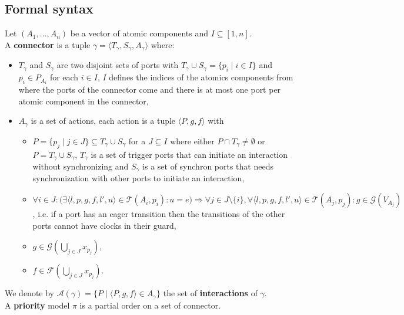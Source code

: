 \documentclass[a4paper]{article}
\begin{document}
\subsection*{Formal syntax}
Let $(A_1, \ldots, A_n)$ be a vector of atomic components and $I \subseteq [1,n]$. \\
A \textbf{connector} is a tuple $\gamma = \langle T_{\gamma}, S_{\gamma}, A_{\gamma} \rangle$ where:
\begin{itemize}
  \item $T_{\gamma}$ and $S_{\gamma}$ are two disjoint sets of ports with
        $T_{\gamma} \cup S_{\gamma} = \{p_i \mid i \in I\}$ and $p_i \in P_{A_i}$ for each $i \in I$, $I$ defines the
        indices of the atomics components from where the ports of the connector come and there is at most one port per
        atomic component in the connector,
  \item $A_{\gamma}$ is a set of actions, each action is a tuple $\langle P, g, f \rangle$ with
        \begin{itemize}
          \item $P = \{p_j \mid j \in J\} \subseteq T_{\gamma} \cup S_{\gamma}$ for a $J \subseteq I$ where either
                $P \cap T_{\gamma} \neq \emptyset$ or $P = T_{\gamma} \cup S_{\gamma}$, $T_{\gamma}$ is a set
                of trigger ports that can initiate an interaction without synchronizing and $S_{\gamma}$ is a set of
                synchron ports that needs synchronization with other ports to initiate an interaction,
          \item $\forall i \in J: \bigl(\exists \langle l, p, g, f, l', u \rangle \in \mathcal{T}(A_i, p_i): u = e
                  \bigr) \Rightarrow \forall j \in J \setminus \{i\}, \forall \langle l, p, g, f, l', u \rangle \in
                  \mathcal{T}(A_j, p_j): g \in \mathcal{G}(V_{A_j})$, i.e. if a port has an eager
                transition then the transitions of the other ports cannot have clocks in their guard,
          \item $g \in \mathcal{G}(\bigcup_{j \in J} x_{p_j})$,
          \item $f \in \mathcal{F}(\bigcup_{j \in J} x_{p_j})$.
        \end{itemize}
\end{itemize}
We denote by $\mathcal{A}(\gamma) = \{P \mid \langle P, g ,f \rangle \in A_{\gamma}\}$ the set of \textbf{interactions}
of $\gamma$. \\
A \textbf{priority} model $\pi$ is a partial order on a set of connector. \\
\end{document}
